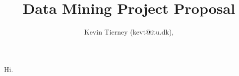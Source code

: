 \documentclass[11pt]{article}
\begin{document}
\title{Data Mining Project Proposal}
\author{Kevin Tierney  (kevt@itu.dk), }

\maketitle

Hi.
\end{document}
